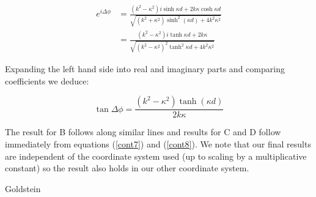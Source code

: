 \documentclass{article}
\begin{document}
\begin{align}
	e^{i\Delta\phi} &= \frac{(k^2-\kappa^2)i\sinh{\kappa d}+2k\kappa \cosh{\kappa d}}{\sqrt{(k^2+\kappa^2)\sinh^{2}(\kappa d)+4k^2\kappa^2}} \\
			&= \frac{(k^2-\kappa^2)i\tanh{\kappa d}+2k\kappa}{\sqrt{(k^2-\kappa^2)^2\tanh^2{\kappa d}+4k^2\kappa^2}}
\end{align}

Expanding the left hand side into real and imaginary parts and comparing coefficients we deduce:

\[
	\tan{\Delta\phi} = \frac{(k^2-\kappa^2)\tanh(\kappa d)}{2k\kappa}
\] 

The result for B follows along similar lines and results for C and D follow immediately from equations (\ref{cont7}) and (\ref{cont8}). We note that our final results are independent of the coordinate system used (up to scaling by a multiplicative constant) so the result also holds in our other coordinate system.

\begin{thebibliography}{100}
Goldstein

\end{thebibliography}
\end{document}

